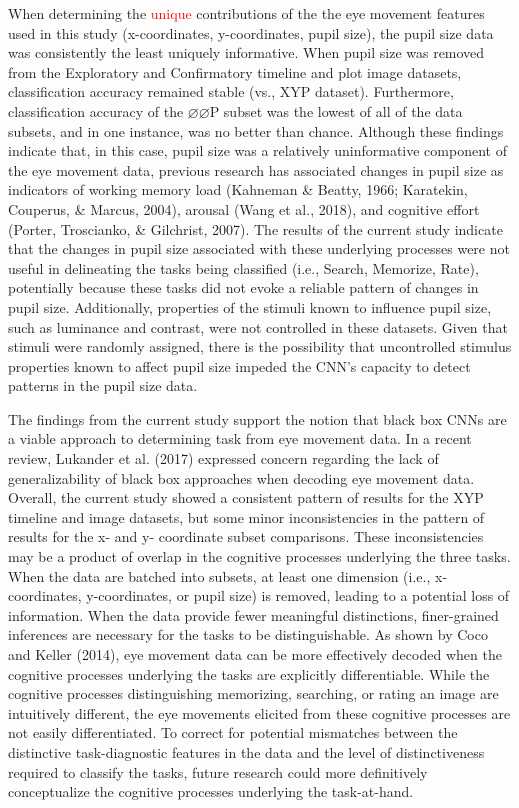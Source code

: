 \documentclass[
  english,
  man, donotrepeattitle,floatsintext]{apa6}
\begin{document}
When determining the \textcolor{red}{unique} contributions of the the eye movement features used in this study (x-coordinates, y-coordinates, pupil size), the pupil size data was consistently the least uniquely informative. When pupil size was removed from the Exploratory and Confirmatory timeline and plot image datasets, classification accuracy remained stable (vs., XYP dataset). Furthermore, classification accuracy of the \(\varnothing\varnothing\)P subset was the lowest of all of the data subsets, and in one instance, was no better than chance. Although these findings indicate that, in this case, pupil size was a relatively uninformative component of the eye movement data, previous research has associated changes in pupil size as indicators of working memory load (Kahneman \& Beatty, 1966; Karatekin, Couperus, \& Marcus, 2004), arousal (Wang et al., 2018), and cognitive effort (Porter, Troscianko, \& Gilchrist, 2007). The results of the current study indicate that the changes in pupil size associated with these underlying processes were not useful in delineating the tasks being classified (i.e., Search, Memorize, Rate), potentially because these tasks did not evoke a reliable pattern of changes in pupil size. Additionally, properties of the stimuli known to influence pupil size, such as luminance and contrast, were not controlled in these datasets. Given that stimuli were randomly assigned, there is the possibility that uncontrolled stimulus properties known to affect pupil size impeded the CNN's capacity to detect patterns in the pupil size data.

The findings from the current study support the notion that black box CNNs are a viable approach to determining task from eye movement data. In a recent review, Lukander et al. (2017) expressed concern regarding the lack of generalizability of black box approaches when decoding eye movement data. Overall, the current study showed a consistent pattern of results for the XYP timeline and image datasets, but some minor inconsistencies in the pattern of results for the x- and y- coordinate subset comparisons. These inconsistencies may be a product of overlap in the cognitive processes underlying the three tasks. When the data are batched into subsets, at least one dimension (i.e., x-coordinates, y-coordinates, or pupil size) is removed, leading to a potential loss of information. When the data provide fewer meaningful distinctions, finer-grained inferences are necessary for the tasks to be distinguishable. As shown by Coco and Keller (2014), eye movement data can be more effectively decoded when the cognitive processes underlying the tasks are explicitly differentiable. While the cognitive processes distinguishing memorizing, searching, or rating an image are intuitively different, the eye movements elicited from these cognitive processes are not easily differentiated. To correct for potential mismatches between the distinctive task-diagnostic features in the data and the level of distinctiveness required to classify the tasks, future research could more definitively conceptualize the cognitive processes underlying the task-at-hand.
\end{document}
